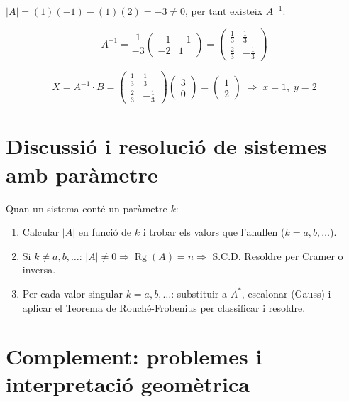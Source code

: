 $|A| = (1)(-1) - (1)(2) = -3 \neq 0$, per tant existeix $A^{-1}$:

\begin{equation*}
A^{-1} = \frac{1}{-3}\begin{pmatrix} -1 & -1 \\ -2 & 1 \end{pmatrix} = \begin{pmatrix} \tfrac13 & \tfrac13 \\ \tfrac23 & -\tfrac13 \end{pmatrix}
\end{equation*}

\begin{equation*}
X = A^{-1}\cdot B = \begin{pmatrix} \tfrac13 & \tfrac13 \\ \tfrac23 & -\tfrac13 \end{pmatrix}\begin{pmatrix} 3 \\ 0 \end{pmatrix} = \begin{pmatrix} 1 \\ 2 \end{pmatrix} \;\Rightarrow\; x = 1,\; y = 2
\end{equation*}

\section{Discussió i resolució de sistemes amb paràmetre}

Quan un sistema conté un paràmetre $k$:

\begin{enumerate}
\item Calcular $|A|$ en funció de $k$ i trobar els valors que l'anul\textperiodcentered{}len ($k = a, b, \ldots$).
\item Si $k \neq a, b, \ldots$: $|A| \neq 0 \Rightarrow \operatorname{Rg}(A) = n \Rightarrow$ S.C.D. Resoldre per Cramer o inversa.
\item Per cada valor singular $k = a, b, \ldots$: substituir a $A^*$, escalonar (Gauss) i aplicar el Teorema de Rouché-Frobenius per classificar i resoldre.
\end{enumerate}

\section{Complement: problemes i interpretació geomètrica}

